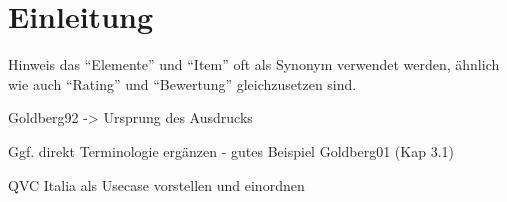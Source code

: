 \section{Einleitung}


Hinweis das ``Elemente'' und ``Item'' oft als Synonym verwendet werden, ähnlich wie auch ``Rating'' und ``Bewertung'' gleichzusetzen sind.

Goldberg92 -> Ursprung des Ausdrucks

Ggf. direkt Terminologie ergänzen - gutes Beispiel Goldberg01 (Kap 3.1)

QVC Italia als Usecase vorstellen und einordnen

\todo[color=white]{}